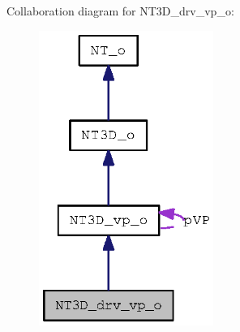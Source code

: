 Collaboration diagram for NT3D\_\-drv\_\-vp\_\-o:
\nopagebreak
\begin{figure}[H]
\begin{center}
\leavevmode
\includegraphics[width=161pt]{class_n_t3_d__drv__vp__o__coll__graph}
\end{center}
\end{figure}
